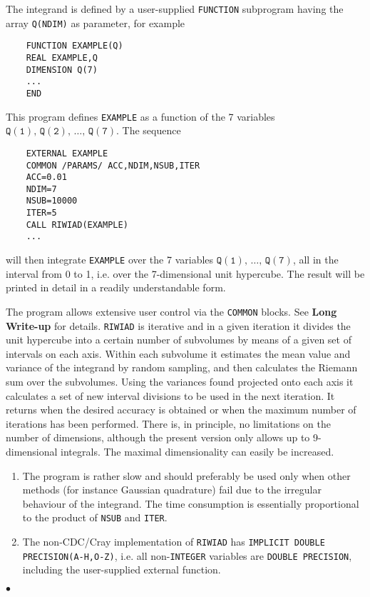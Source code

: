 The integrand is defined by a user-supplied {\tt FUNCTION}
subprogram having the array {\tt Q(NDIM)} as parameter, for example
\begin{verbatim}
    FUNCTION EXAMPLE(Q)
    REAL EXAMPLE,Q
    DIMENSION Q(7)
    ...
    END
\end{verbatim}
\newpage
This program defines {\tt EXAMPLE} as a function of the 7
variables $\mathtt{Q(1),\,Q(2),\,\ldots,\,Q(7)}$. The sequence
\begin{verbatim}
    EXTERNAL EXAMPLE
    COMMON /PARAMS/ ACC,NDIM,NSUB,ITER
    ACC=0.01
    NDIM=7
    NSUB=10000
    ITER=5
    CALL RIWIAD(EXAMPLE)
    ...
\end{verbatim}
will then integrate {\tt EXAMPLE} over the 7 variables
$\mathtt{Q(1),\,\ldots,\,Q(7)}$,
all in the interval from 0 to 1, i.e. over the 7-dimensional
unit hypercube. The result will be printed in detail in a readily
understandable form.
\par
The program allows extensive user control via the {\tt COMMON} blocks.
See {\bf Long Write-up} for details.
\Method
{\tt RIWIAD} is iterative and in a given
iteration it divides the unit hypercube into a certain number of
subvolumes by means of a given set of intervals on each axis. Within
each subvolume it estimates the mean value and variance of the
integrand by random sampling, and then calculates the Riemann sum over
the subvolumes. Using the variances found projected onto each axis it
calculates a set of new interval divisions to be used in the next
iteration. It returns when the desired accuracy is obtained or when
the maximum number of iterations has been performed.
\Restrict
There is, in principle, no limitations on the number of
dimensions, although the present version only allows up to
9-dimensional integrals. The maximal dimensionality can easily be
increased.
\Notes
\begin{enumerate}
\item The program is rather slow and should preferably be used only
when other methods (for instance Gaussian quadrature) fail due to
the irregular behaviour of the integrand. The time consumption is
essentially proportional to the product of {\tt NSUB} and {\tt ITER}.
\item The non-CDC/Cray implementation of {\tt RIWIAD} has
{\tt IMPLICIT DOUBLE PRECISION(A-H,O-Z)},
i.e. all non-{\tt INTEGER} variables are {\tt DOUBLE PRECISION},
including the user-supplied external function.
\end{enumerate}
$\bullet$
